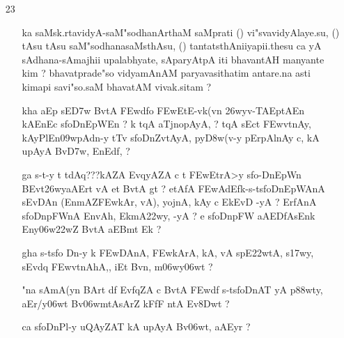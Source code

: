 \def\DevnagVersion{2.15}\documentclass{article}
\begin{document}
\begin{itemize}

\item[23] \begin{itemize}
           
           \item[\dn ka] saMsk.rtavidyA-saM"sodhanArthaM saMprati () vi"svavidyAlaye.su, () tAsu tAsu saM"sodhanasaMsthAsu, () tantatsthAniiyapii.thesu ca yA sAdhana-sAmajhii upalabhyate, sAparyAtpA iti bhavantAH manyante kim ? bhavatprade"so vidyamAnAM paryavasithatim antare.na asti kimapi savi"so.saM bhavatAM vivak.sitam ? 

           \item[\dn kha] {\dn aEp sE\3D7w BvtA\2 \3FEwd\?fo \3FEwEtE-vk(v\?n \326wyv-TAEptAEn kAEnEc s\2foDnEpWEn {\rs ?\re} k\? t\?qA aT\?{\qvb}j\0nopAyA, {\rs ?\re} t\?qA\2 sEct\2 \3FEwvt\0{\rs -\re}nAy{\rs ,\re} kAy\0PlEn\309wpAdn-y tT\4v s\2foDnZvtAyA, py\0\3D8w(v-y pErpAlnAy c{\rs ,\re} kA upAyA Bv\3D7w, EnEd\2f\?, {\rs ?\re}}
           
           \item[\dn ga] {\dn s\2-t-y t\? tdAq{\rs ???\re}kAZA\2 EvqyAZA\2 c t\? \3FEwEtrA>y\2 s\2fo{\rs -\re}DnEpW\?n BEvt\326wyaAErt vA et BvtA\2 gt {\rs ?\re} etAfA\2  \3FEwAd\?Efk{\rs -\re}s\2-ts\2foDnEpWAnA\2 s\2EvDAn\2 {\rs (\re}EnmA\0Z\3FEwkAr, vA{\rs ),\re} yojnA{\rs ,\re} kAy\0 c Ek\2EvD\2 -yA {\rs ?\re} ErfAnA\2 s\2foDnpFWnA\2 EnvA\0h, EkmA\322wy, -yA {\rs ?\re} e s\2foDnpFW\? aAEDfAsEnk\2 Eny\306w\322wZ\2 BvtA aEBmt\2 Ek {\rs ?\re}}

          \item[\dn gha] {\dn s\2-ts\2fo Dn-y k\? \3FEwDAnA, \3FEwkArA, kA, vA sp\?E\322wtA, s\317wy\0, sEvd\?{\qva}q \3FEwvt\0nAhA\0,{\rs ,\re} iEt Bvn, m\306wy\306wt\? {\rs ?\re}}
          
          \item[\dn "na] {\dn sAmA(y\?n BArt\? d\?f\?{\rs ,\re} Evf\?q\?ZA c BvtA\2 \3FEwd\?f\?{\rs ,\re} s\2-ts\2foDnAT{\rdt} yA\2 p\388wty, aEr/y\306wt\?{\rs ,\re} Bv\306wmtAsAr\?Z kFfF ntA Ev\38Dwt\? {\rs ?\re}}
          
          \item[\dn ca] {\dn s\2foDnPl-y uQAyZAT{\rdt} kA upAyA Bv\306wt, aAEy\?r {\rs ?\re}}
          

\end{itemize}
\end{itemize}
\end{document}
